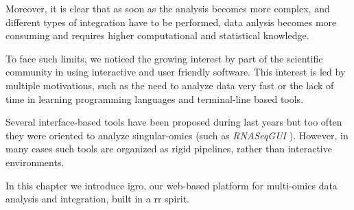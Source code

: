 Moreover, it is clear that as soon as the analysis becomes more complex, and different types of integration have to be performed, data anlysis becomes more consuming and requires higher computational and statistical knowledge.


To face such limits, we noticed the growing interest by part of the scientific community in using interactive and user friendly software.
This interest is led by multiple motivations, such as the need to analyze data very fast or the lack of time in learning programming languages and terminal-line based tools.

Several interface-based tools \cite{Poplawski2016} have been proposed during last years but too often they were oriented to analyze singular-omics (such as \textit{RNASeqGUI} \cite{russo2015advantages}).
However, in many cases such tools are organized as rigid pipelines, rather than interactive environments.

In this chapter we introduce \gls{igro}, our web-based platform for multi-omics data analysis and integration, built in a \gls{rr} spirit.


%
%
%
%


